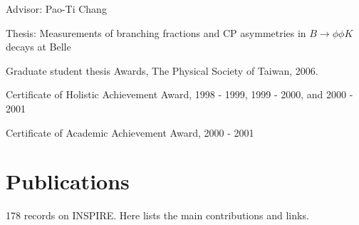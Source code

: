 \documentclass[letterpaper]{deedy-resume-openfont}
\begin{document}
\begin{tightemize}
\item Advisor: Pao-Ti Chang
\item Thesis: Measurements of branching fractions and CP asymmetries in $B \to \phi \phi K$ decays at Belle\\
      \href{http://www.airitilibrary.com/Publication/alDetailedMesh1?DocID=U0001-1407200616551200}{\color{link}{Thesis link}}
\item Graduate student thesis Awards, The Physical Society of Taiwan, 2006.
\end{tightemize}
\sectionsep

\begin{tightemize}
\item Certificate of Holistic Achievement Award, 1998 - 1999, 1999 - 2000, and 2000 - 2001
\item Certificate of Academic Achievement Award, 2000 - 2001
\end{tightemize}
\sectionsep


%
%


\section{Publications}
178 records on INSPIRE. Here lists the main contributions and links.
\end{document}
